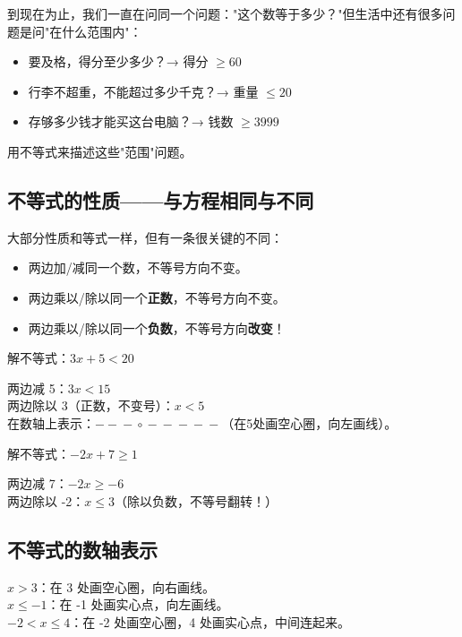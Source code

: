 到现在为止，我们一直在问同一个问题："这个数等于多少？"但生活中还有很多问题是问"在什么范围内"：

\begin{itemize}
  \item 要及格，得分至少多少？→ 得分 $\ge 60$
  \item 行李不超重，不能超过多少千克？→ 重量 $\le 20$
  \item 存够多少钱才能买这台电脑？→ 钱数 $\ge 3999$
\end{itemize}

用不等式来描述这些"范围"问题。

\subsection*{不等式的性质——与方程相同与不同}

大部分性质和等式一样，但有一条很关键的不同：

\begin{itemize}
  \item 两边加/减同一个数，不等号方向不变。
  \item 两边乘以/除以同一个\textbf{正数}，不等号方向不变。
  \item 两边乘以/除以同一个\textbf{负数}，不等号方向\textbf{改变}！
\end{itemize}

\begin{example}
解不等式：$3x+5<20$
\end{example}
\begin{solution}
两边减 5：$3x < 15$\\
两边除以 3（正数，不变号）：$x < 5$\\
在数轴上表示：$-\!\!\!-\!\!\!-\!\!\!\circ\!\!-\!\!\!-\!\!\!-\!\!-\!\!\!-$（在5处画空心圈，向左画线）。
\end{solution}

\begin{example}
解不等式：$-2x+7\ge 1$
\end{example}
\begin{solution}
两边减 7：$-2x \ge -6$\\
两边除以 -2：{\color{exred}$x \le 3$}（除以负数，不等号翻转！）
\end{solution}

\subsection*{不等式的数轴表示}

$x > 3$：在 3 处画空心圈，向右画线。\\
$x \le -1$：在 -1 处画实心点，向左画线。\\
$-2 < x \le 4$：在 -2 处画空心圈，4 处画实心点，中间连起来。


